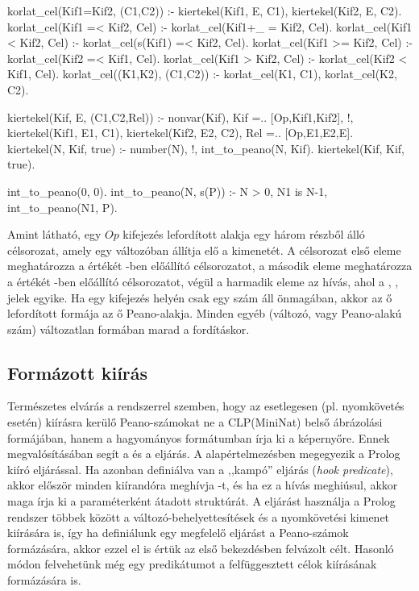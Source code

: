 \begin{prologcode}
korlat_cel(Kif1=Kif2, (C1,C2)) :-
        kiertekel(Kif1, E, C1), 
        kiertekel(Kif2, E, C2). 
korlat_cel(Kif1 =< Kif2, Cel) :- 
        korlat_cel(Kif1+_ = Kif2, Cel). 
korlat_cel(Kif1 < Kif2, Cel) :- 
        korlat_cel(s(Kif1) =< Kif2, Cel). 
korlat_cel(Kif1 >= Kif2, Cel) :- 
        korlat_cel(Kif2 =< Kif1, Cel). 
korlat_cel(Kif1 > Kif2, Cel) :- 
        korlat_cel(Kif2 < Kif1, Cel). 
korlat_cel((K1,K2), (C1,C2)) :- 
        korlat_cel(K1, C1), 
        korlat_cel(K2, C2). 

kiertekel(Kif, E, (C1,C2,Rel)) :- 
        nonvar(Kif), 
        Kif =.. [Op,Kif1,Kif2], !, 
        kiertekel(Kif1, E1, C1), 
        kiertekel(Kif2, E2, C2), 
        Rel =.. [Op,E1,E2,E]. 
kiertekel(N, Kif, true) :- 
        number(N), !,  
        int_to_peano(N, Kif). 
kiertekel(Kif, Kif, true). 

int_to_peano(0, 0). 
int_to_peano(N, s(P)) :- 
        N > 0, N1 is N-1,  
        int_to_peano(N1, P).
\end{prologcode}

Amint látható, egy  $Op$  kifejezés lefordított alakja
egy három részből álló célsorozat, amely egy  változóban állítja
elő a kimenetét. A célsorozat első eleme meghatározza a  értékét
-ben előállító célsorozatot, a második eleme meghatározza a
 értékét -ben előállító célsorozatot, végül a harmadik
eleme az  hívás, ahol  a \cd{+}, \cd{-}, \cd{*}
jelek egyike. Ha egy kifejezés helyén csak egy szám áll önmagában, akkor az ő
lefordított formája az ő Peano-alakja. Minden egyéb (változó, vagy Peano-alakú
szám) változatlan formában marad a fordításkor.

\subsection{Formázott kiírás}

Természetes elvárás a rendszerrel szemben, hogy az esetlegesen (pl. nyomkövetés
esetén) kiírásra kerülő Peano-számokat ne a CLP(MiniNat) belső ábrázolási
formájában, hanem a hagyományos formátumban írja ki a képernyőre. Ennek
megvalósításában segít a  és a  eljárás.
\br
A  alapértelmezésben megegyezik a  Prolog kiíró
eljárással. Ha azonban definiálva van a  ,,kampó'' eljárás
(\emph{hook predicate}), akkor először minden kiírandóra meghívja
-t, és ha ez a hívás meghiúsul, akkor maga írja ki a
paraméterként átadott struktúrát. A  eljárást használja a
Prolog rendszer többek között a változó-behelyettesítések és a nyomkövetési
kimenet kiírására is, így ha definiálunk egy megfelelő 
eljárást a Peano-számok formázására, akkor ezzel el is értük az első
bekezdésben felvázolt célt. Hasonló módon felvehetünk még egy 
predikátumot a felfüggesztett célok kiírásának formázására is.

